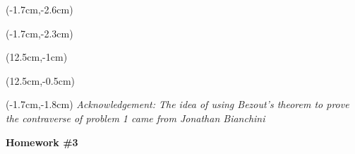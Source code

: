 \documentclass[12pt, oneside]{article}
\begin{document}
\begin{textblock*}{3cm}(-1.7cm,-2.6cm)
\end{textblock*}

\begin{textblock*}{4cm}(-1.7cm,-2.3cm)
\end{textblock*}

\begin{textblock*}{8cm}(12.5cm,-1cm)
\end{textblock*}
\begin{textblock*}{3cm}(12.5cm,-0.5cm)
\end{textblock*}
\begin{textblock*}{13.5cm}(-1.7cm,-1.8cm)
\noindent \textit{\footnotesize Acknowledgement: The idea of using Bezout's theorem to prove the contraverse of problem 1 came from Jonathan Bianchini} 
\end{textblock*}

\vspace{1cm}

\begin{center}
\textbf{\Large Homework \#3}
\end{center}


\end{document}
